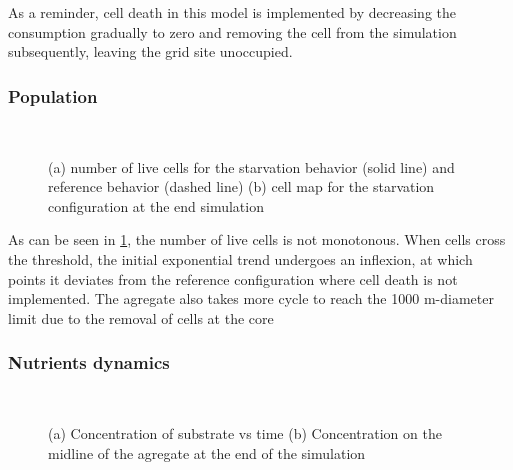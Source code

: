 \documentclass[11pt,a4paper]{article}
\begin{document}
As a reminder, cell death in this model is implemented by decreasing the consumption gradually to zero and removing the cell from the simulation subsequently, leaving the grid site unoccupied.\\

\subsubsection{Population}
\begin{figure}[h]
\begin{subfigure}{0.5\textwidth}
	\centering
	
	\caption{ \label{starv_numbers}}
\end{subfigure}
~~
\begin{subfigure}{0.5\textwidth}
	\centering
	
	\caption{\label{starv_Grid}}
\end{subfigure}
\caption{(a) number of live cells for the starvation behavior (solid line) and reference behavior (dashed line) (b) cell map for the starvation configuration at the end simulation \label{starv_numbers_Grid}}
\end{figure}

As can be seen in \ref{starv_numbers}, the number of live cells is not monotonous. When cells cross the threshold, the initial exponential trend undergoes an inflexion, at which points it deviates from the reference configuration where cell death is not implemented. The agregate also takes more cycle to reach the 1000 \textmu m-diameter limit due to the removal of cells at the core\\

\newpage
\subsubsection{Nutrients dynamics}
\begin{figure}[h]
\begin{subfigure}{0.5\textwidth}
	\centering
	
	\caption{ \label{starv_S_center}}
\end{subfigure}
~~
\begin{subfigure}{0.5\textwidth}
	\centering
	
	\caption{\label{S_starv_midline}}
\end{subfigure}
\caption{(a) Concentration of substrate vs time (b) Concentration on the midline of the agregate at the end of the simulation \label{tarv_SO}}
\end{figure}
\end{document}
